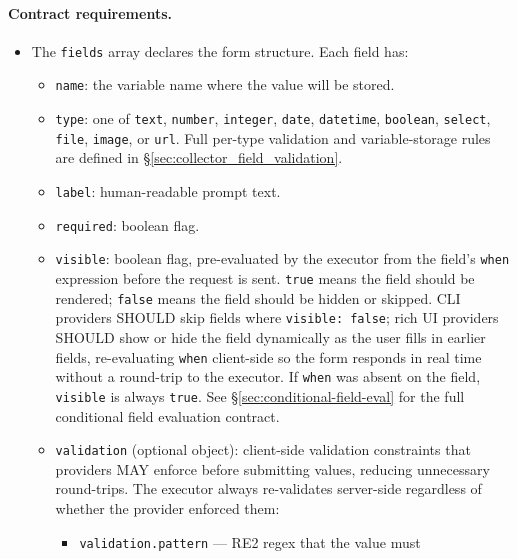 \paragraph{Contract requirements.}
\begin{itemize}
  \item The \texttt{fields} array declares the form structure.  Each field has:
        \begin{itemize}
          \item \texttt{name}: the variable name where the value will be stored.
          \item \texttt{type}: one of \texttt{text}, \texttt{number},
                \texttt{integer}, \texttt{date}, \texttt{datetime},
                \texttt{boolean}, \texttt{select}, \texttt{file},
                \texttt{image}, or \texttt{url}.  Full per-type validation and
                variable-storage rules are defined in
                §\ref{sec:collector_field_validation}.
          \item \texttt{label}: human-readable prompt text.
          \item \texttt{required}: boolean flag.
          \item \texttt{visible}: boolean flag, pre-evaluated by the executor from
                the field's \texttt{when} expression before the request is sent.
                \texttt{true} means the field should be rendered; \texttt{false}
                means the field should be hidden or skipped.  CLI providers SHOULD
                skip fields where \texttt{visible: false}; rich UI providers SHOULD
                show or hide the field dynamically as the user fills in earlier
                fields, re-evaluating \texttt{when} client-side so the form responds
                in real time without a round-trip to the executor.  If \texttt{when}
                was absent on the field, \texttt{visible} is always \texttt{true}.
                See §\ref{sec:conditional-field-eval} for the full conditional field
                evaluation contract.
          \item \texttt{validation} (optional object): client-side validation
                constraints that providers MAY enforce before submitting values,
                reducing unnecessary round-trips.  The executor always re-validates
                server-side regardless of whether the provider enforced them:
                \begin{itemize}
                  \item \texttt{validation.pattern} — RE2 regex that the value must

\end{itemize}
\end{itemize}
\end{itemize}
